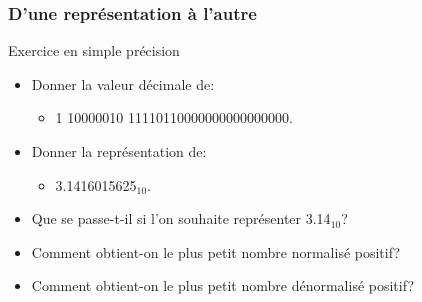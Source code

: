 \documentclass{beamer}
\begin{document}
%	

%	

%	


\begin{frame}
	\frametitle{D'une représentation à l'autre}
	
	\begin{block}{Exercice en simple précision}
		\begin{itemize}
			\item Donner la valeur décimale de:
			\begin{itemize}
				\item 1 10000010 11110110000000000000000.
			\end{itemize}
			
			\item Donner la représentation de:
			\begin{itemize}
				\item 3.1416015625$_{10}$.
			\end{itemize}
			
			\item Que se passe-t-il si l'on souhaite représenter 3.14$_{10}$?
			
			\item Comment obtient-on le plus petit nombre normalisé positif?
			
			\item Comment obtient-on le plus petit nombre dénormalisé positif?
		\end{itemize}
	\end{block}
\end{frame}
\end{document}
